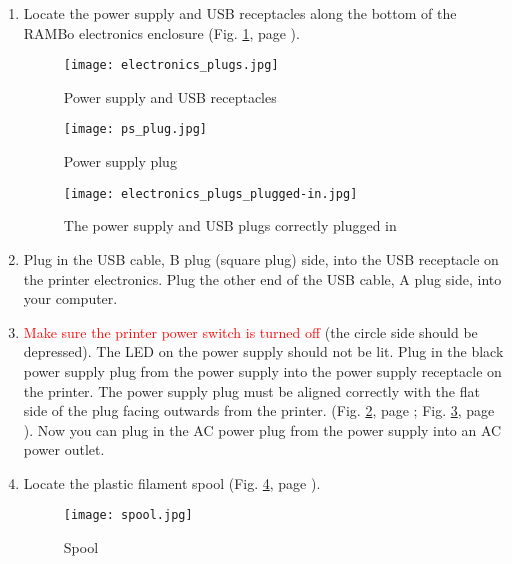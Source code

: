 \begin{enumerate}
\item Locate the power supply and USB receptacles along the bottom of the RAMBo electronics enclosure
(Fig. \ref{fig:electronics_plugs}, page \pageref{fig:electronics_plugs}).
\begin{figure}[hbt]
\centering
\texttt{[image: electronics\_plugs.jpg]}
\caption{Power supply and USB receptacles}
\label{fig:electronics_plugs}
\end{figure}
\begin{figure}[hp]
\centering
\texttt{[image: ps\_plug.jpg]}
\caption{Power supply plug}
\label{fig:ps_plug}
\end{figure}
\begin{figure}[hp]
\centering
\texttt{[image: electronics\_plugs\_plugged-in.jpg]}
\caption{The power supply and USB plugs correctly plugged in}
\label{fig:electronics_plugs_plugged-in}
\end{figure}

\item Plug in the USB cable, B plug (square plug) side, into the USB receptacle on the printer electronics. Plug the other end of the USB cable, A plug side, into your computer.

\item \textcolor{red}{Make sure the printer power switch is turned off} (the circle side should be depressed). The LED on the power supply should not be lit. Plug in the black power supply plug from the power supply into the power supply receptacle on the printer. The power supply plug must be aligned correctly with the flat side of the plug facing outwards from the printer. (Fig. \ref{fig:ps_plug}, page \pageref{fig:ps_plug}; Fig. \ref{fig:electronics_plugs_plugged-in}, page \pageref{fig:electronics_plugs_plugged-in}). Now you can plug in the AC power plug from the power supply into an AC power outlet.

\item Locate the plastic filament spool
(Fig. \ref{fig:spool}, page \pageref{fig:spool}).
\begin{figure}[hbt]
\centering
\texttt{[image: spool.jpg]}
\caption{Spool}
\label{fig:spool}
\end{figure}


\end{enumerate}

